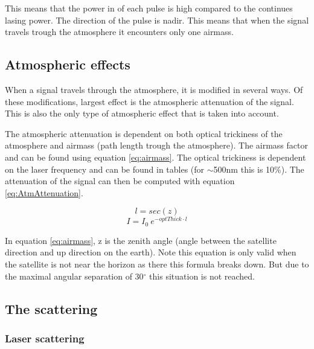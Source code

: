 This means that the power in of each pulse is high compared to the continues lasing power. The direction of the pulse is nadir. This means that when the signal travels trough the atmosphere it encounters only one airmass.

\subsection{Atmospheric effects}

When a signal travels through the atmosphere, it is modified in several ways. Of these modifications, largest effect is the atmospheric attenuation of the signal. This is also the only type of atmospheric effect that is taken into account.

The atmospheric attenuation is dependent on both optical trickiness of the atmosphere and airmass (path length trough the atmosphere). The airmass factor and can be found using equation \ref{eq:airmass}. The optical trickiness is dependent on the laser frequency and can be found in tables (for $\sim$500nm this is 10\%). The attenuation of the signal can then be computed with equation \ref{eq:AtmAttenuation}.

\begin{equation}
	l = sec (z)
	\label{eq:airmass}
\end{equation}
\begin{equation}
	I = I_0 \: e^{ -optThick \cdot l }
	\label{eq:AtmAttenuation}
\end{equation}

In equation \ref{eq:airmass}, z is the zenith angle (angle between the satellite direction and up direction on the earth). Note this equation is only valid when the satellite is not near the horizon as there this formula breaks down. But due to the maximal angular separation of 30$^\circ$ this situation is not reached.

\subsection{The scattering}
\subsubsection{Laser scattering}

